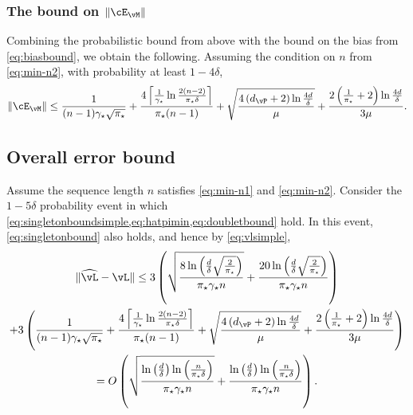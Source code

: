 \subsubsection{The bound on $\norm{\errm}$}
Combining the probabilistic bound from above with the bound on the
bias from \cref{eq:biasbound}, we obtain the following.
Assuming the condition on $n$ from \cref{eq:min-n2}, with probability
at least $1-4\delta$,
\begin{equation}
  \norm{\errm}
  \leq
  \frac{1}{(n-1)\gap\sqrt{\pimin}}
  +
  \frac{4
    \Ceil{
      \frac{1}{\gap}\ln\frac{2(n-2)}{\pimin\delta}
    }
  }{\pimin(n-1)}
  +
  \sqrt{
    \frac{4\Parens{ d_{\vP} + 2 } \ln\frac{4d}{\delta}}
    {\mu}
  }
  + \frac{2\Parens{ \frac1{\pimin} + 2 } \ln\frac{4d}{\delta}}
  {3\mu}
  .
  \label{eq:doubletbound}
\end{equation}

\subsection{Overall error bound}
Assume the sequence length $n$ satisfies \cref{eq:min-n1} and
\cref{eq:min-n2}.
Consider the $1-5\delta$ probability event in which
\cref{eq:singletonboundsimple,eq:hatpimin,eq:doubletbound} hold.
In this event, \cref{eq:singletonbound} also holds, and hence by
\cref{eq:vlsimple},
\begin{multline*}
  \norm{\wh\vL - \vL}
  \leq
  3
  \Parens{
    \sqrt{
      \frac{
        8\ln\Parens{\frac{d}\delta\sqrt{\frac{2}{\pimin}}}
      }{
        \pimin\gap n
      }
    }
    +
    \frac{
      20\ln\Parens{\frac{d}\delta\sqrt{\frac{2}{\pimin}}}
    }{
      \pimin\gap n
    }
  }
  \\
  +
  3\Parens{
    \frac{1}{(n-1)\gap\sqrt{\pimin}}
    +
    \frac{4
      \Ceil{
        \frac{1}{\gap}\ln\frac{2(n-2)}{\pimin\delta}
      }
    }{\pimin(n-1)}
    +
    \sqrt{
      \frac{4\Parens{ d_{\vP} + 2 } \ln\frac{4d}{\delta}}
      {\mu}
    }
    + \frac{2\Parens{ \frac1{\pimin} + 2 } \ln\frac{4d}{\delta}}
    {3\mu}
  }
  \\
  =
  O
  \Parens{
    \sqrt{
      \frac{
        \ln\Parens{\frac{d}{\delta}}
        \ln\Parens{\frac{n}{\pimin\delta}}
      }{\pimin\gap n}
    }
    +
    \frac{
      \ln\Parens{\frac{d}{\delta}}
      \ln\Parens{\frac{n}{\pimin\delta}}
    }{\pimin\gap n}
  }
  .
\end{multline*}


